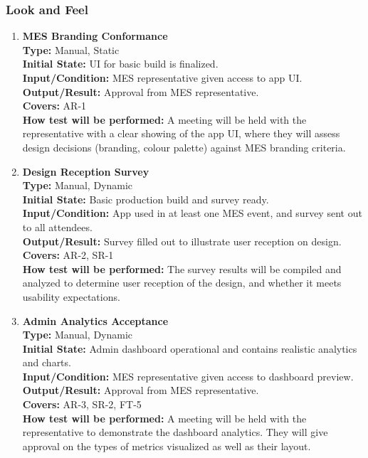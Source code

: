 \documentclass[12pt, titlepage]{article}
\begin{document}
\subsubsection{Look and Feel}
\begin{enumerate}[label=\bfseries LF-\arabic*:, wide=0pt]
  \item \label{test-LF1} \textbf{MES Branding Conformance}\\[2mm]
    {\bf Type:} Manual, Static\\
    {\bf Initial State:} UI for basic build is finalized.\\
    {\bf Input/Condition:} MES representative given access to app UI.\\
    {\bf Output/Result:} Approval from MES representative.\\
    {\bf Covers:} AR-1\\
    {\bf How test will be performed:} A meeting will be held with the representative with a clear showing of the app UI, where they will assess design decisions (branding, colour palette) against MES branding criteria.

  \item \label{test-LF2} \textbf{Design Reception Survey}\\[2mm]
    {\bf Type:} Manual, Dynamic\\
    {\bf Initial State:} Basic production build and survey ready.\\
    {\bf Input/Condition:} App used in at least one MES event, and survey sent out to all attendees.\\
    {\bf Output/Result:} Survey filled out to illustrate user reception on design.\\
    {\bf Covers:} AR-2, SR-1\\
    {\bf How test will be performed:} The survey results will be compiled and analyzed to determine user reception of the design, and whether it meets usability expectations.

    \item \label{test-LF3} \textbf{Admin Analytics Acceptance}\\[2mm]
    {\bf Type:} Manual, Dynamic\\
    {\bf Initial State:} Admin dashboard operational and contains realistic analytics and charts.\\
    {\bf Input/Condition:} MES representative given access to dashboard preview.\\
    {\bf Output/Result:} Approval from MES representative.\\
    {\bf Covers:} AR-3, SR-2, FT-5\\
    {\bf How test will be performed:} A meeting will be held with the representative to demonstrate the dashboard analytics. They will give approval on the types of metrics visualized as well as their layout.
\end{enumerate}
\end{document}
